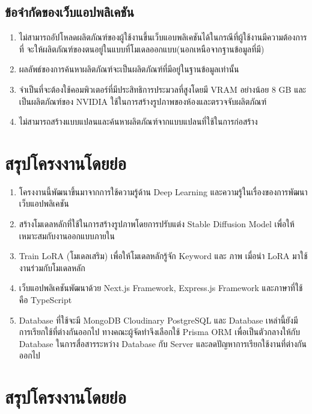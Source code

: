 \documentclass[12pt,oneside,openright,a4paper]{cpe-thai-project}
\begin{document}
\subsection{ข้อจำกัดของเว็บแอปพลิเคชัน }
\begin{enumerate}
\item ไม่สามารถอัปโหลดผลิตภัณฑ์ของผู้ใช้งานขึ้นเว็บแอบพลิเคชันได้ในกรณีที่ผู้ใช้งานมีความต้องการที่	จะให้ผลิตภัณฑ์ของตนอยู่ในแบบที่โมเดลออกแบบ(นอกเหนือจากฐานข้อมูลที่มี)
\item ผลลัพธ์ของการค้นหาผลิตภัณฑ์จะเป็นผลิตภัณฑ์ที่มีอยู่ในฐานข้อมูลเท่านั้น
\item จำเป็นที่จะต้องใช้คอมพิวเตอร์ที่มีประสิทธิการประมวลที่สูงโดยมี VRAM อย่างน้อย 8 GB และเป็นผลิตภัณฑ์ของ NVIDIA ใช้ในการสร้างรูปภาพของห้องและตรวจจับผลิตภัณฑ์ 
\item ไม่สามารถสร้างแบบแปลนและค้นหาผลิตภัณฑ์จากแบบแปลนที่ใช้ในการก่อสร้าง
\end{enumerate}

\section{สรุปโครงงานโดยย่อ}
\begin{enumerate}
\item โครงงานนี้พัฒนาขึ้นมาจากการใช้ความรู้ด้าน Deep Learning และความรู้ในเรื่องของการพัฒนาเว็บแอปพลิเคชัน
\item สร้างโมเดลหลักที่ใช้ในการสร้างรูปภาพโดยการปรับแต่ง Stable Diffusion Model เพื่อให้เหมาะสมกับงานออกแบบภายใน 
\item Train LoRA (โมเดลเสริม) เพื่อให้โมเดลหลักรู้จัก Keyword และ ภาพ เมื่อนำ LoRA มาใช้งานร่วมกับโมเดลหลัก
\item เว็บแอปพลิเคชันพัฒนาด้วย Next.js Framework, Express.js Framework และภาษาที่ใช้คือ TypeScript
\item Database ที่ใช้จะมี MongoDB Cloudinary PostgreSQL และ Database เหล่านี้ยังมีการเรียกใช้ที่ต่างกันออกไป ทางคณะผู้จัดทำจึงเลือกใช้ Prisma ORM เพื่อเป็นตัวกลางให้กับ Database ในการสื่อสารระหว่าง Database กับ Server และลดปัญหาการเรียกใช้งานที่ต่างกันออกไป
\end{enumerate}

\section{สรุปโครงงานโดยย่อ}
\end{document}
